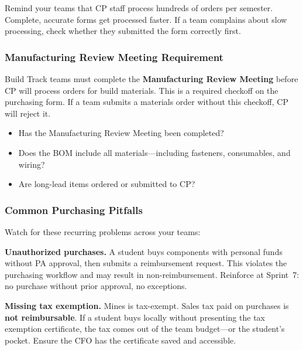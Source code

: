 \begin{tipbox}
Remind your teams that CP staff process hundreds of orders per semester. Complete, accurate forms get processed faster. If a team complains about slow processing, check whether they submitted the form correctly first.
\end{tipbox}

\subsubsection{Manufacturing Review Meeting Requirement}

Build Track teams must complete the \textbf{Manufacturing Review Meeting} before CP will process orders for build materials. This is a required checkoff on the purchasing form. If a team submits a materials order without this checkoff, CP will reject it.

\begin{paquestion}
\begin{itemize}[nosep,leftmargin=1.5em]
\item Has the Manufacturing Review Meeting been completed?
\item Does the BOM include all materials---including fasteners, consumables, and wiring?
\item Are long-lead items ordered or submitted to CP?
\end{itemize}
\end{paquestion}

\subsubsection{Common Purchasing Pitfalls}

Watch for these recurring problems across your teams:

\begin{redflag}
\textbf{Unauthorized purchases.} A student buys components with personal funds without PA approval, then submits a reimbursement request. This violates the purchasing workflow and may result in non-reimbursement. Reinforce at Sprint~7: no purchase without prior approval, no exceptions.
\end{redflag}

\begin{redflag}
\textbf{Missing tax exemption.} Mines is tax-exempt. Sales tax paid on purchases is \textbf{not reimbursable}. If a student buys locally without presenting the tax exemption certificate, the tax comes out of the team budget---or the student's pocket. Ensure the CFO has the certificate saved and accessible.
\end{redflag}

